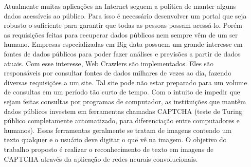 \begin{resumo}
        
Atualmente muitas aplicações na Internet seguem a política de manter
alguns dados acessíveis ao público. Para isso é necessário desenvolver
um portal que seja robusto o suficiente para garantir que todas as
pessoas possam acessá-lo. Porém as requisições feitas para recuperar
dados públicos nem sempre vêm de um ser humano. Empresas
especializadas em Big data possuem um grande interesse em fontes de
dados públicos para poder fazer análises e previsões a partir de dados
atuais. Com esse interesse, Web Crawlers são implementados. Eles são
responsáveis por consultar fontes de dados milhares de vezes ao dia,
fazendo diversas requisições a um site. Tal site pode não estar
preparado para um volume de consultas em um período tão curto de
tempo. Com o intuito de impedir que sejam feitas consultas por
programas de computador, as instituições que mantêm dados públicos
investem em ferramentas chamadas CAPTCHA (teste de Turing público
completamente automatizado, para diferenciação entre computadores e
humanos). Essas ferramentas geralmente se tratam de imagens contendo
um texto qualquer e o usuário deve digitar o que vê na imagem. O
objetivo do trabalho proposto é realizar o reconhecimento de texto em
imagens de CAPTCHA através da aplicação de redes neurais
convolucionais.

\end{resumo}
